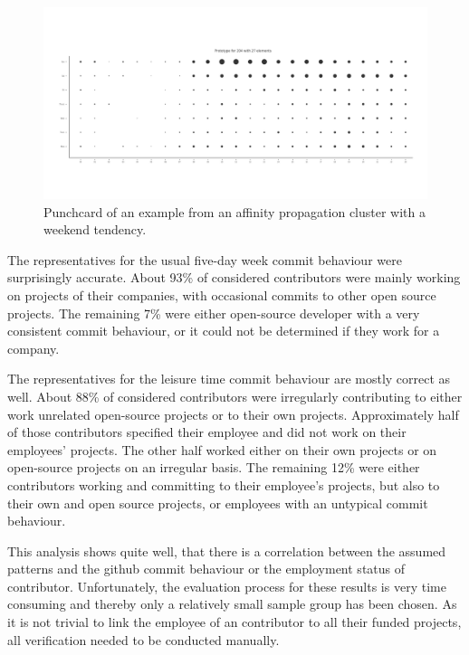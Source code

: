 \begin{figure}[H]
    \includegraphics[scale=0.32]{./graphs/analysis-affinity/204}
    \centering
    \caption{Punchcard of an example from an affinity propagation cluster with a weekend tendency.}\label{fig:random-sleep-rhythm}
\end{figure}

The representatives for the usual five-day week commit behaviour were surprisingly accurate.
About 93\% of considered contributors were mainly working on projects of their companies, with occasional commits to other open source projects.
The remaining 7\% were either open-source developer with a very consistent commit behaviour, or it could not be determined if they work for a company.



The representatives for the leisure time commit behaviour are mostly correct as well.
About 88\% of considered contributors were irregularly contributing to either work unrelated open-source projects or to their own projects.
Approximately half of those contributors specified their employee and did not work on their employees' projects.
The other half worked either on their own projects or on open-source projects on an irregular basis.
The remaining 12\% were either contributors working and committing to their employee's projects, but also to their own and open source projects, or employees with an untypical commit behaviour.




This analysis shows quite well, that there is a correlation between the assumed patterns and the github commit behaviour or the employment status of contributor.
Unfortunately, the evaluation process for these results is very time consuming and thereby only a relatively small sample group has been chosen.
As it is not trivial to link the employee of an contributor to all their funded projects, all verification needed to be conducted manually.

